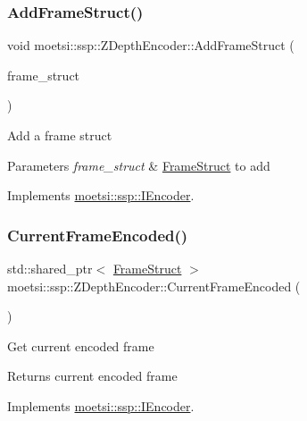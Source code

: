 \subsubsection{\texorpdfstring{Add\+Frame\+Struct()}{AddFrameStruct()}}
{\footnotesize\ttfamily void moetsi\+::ssp\+::\+Z\+Depth\+Encoder\+::\+Add\+Frame\+Struct (\begin{DoxyParamCaption}\item[{std\+::shared\+\_\+ptr$<$ \hyperlink{structmoetsi_1_1ssp_1_1FrameStruct}{Frame\+Struct} $>$ \&}]{frame\+\_\+struct }\end{DoxyParamCaption})\hspace{0.3cm}{\ttfamily [virtual]}}

Add a frame struct 
\begin{DoxyParams}{Parameters}
{\em frame\+\_\+struct} & \hyperlink{structmoetsi_1_1ssp_1_1FrameStruct}{Frame\+Struct} to add \\
\hline
\end{DoxyParams}


Implements \hyperlink{classmoetsi_1_1ssp_1_1IEncoder_a8c223ec82fdd30ee8ee75157306054ec}{moetsi\+::ssp\+::\+I\+Encoder}.

\mbox{\label{classmoetsi_1_1ssp_1_1ZDepthEncoder_a075752f62bbc40f71026812c5548ef5f}} 
\subsubsection{\texorpdfstring{Current\+Frame\+Encoded()}{CurrentFrameEncoded()}}
{\footnotesize\ttfamily std\+::shared\+\_\+ptr$<$ \hyperlink{structmoetsi_1_1ssp_1_1FrameStruct}{Frame\+Struct} $>$ moetsi\+::ssp\+::\+Z\+Depth\+Encoder\+::\+Current\+Frame\+Encoded (\begin{DoxyParamCaption}{ }\end{DoxyParamCaption})\hspace{0.3cm}{\ttfamily [virtual]}}

Get current encoded frame \begin{DoxyReturn}{Returns}
current encoded frame 
\end{DoxyReturn}


Implements \hyperlink{classmoetsi_1_1ssp_1_1IEncoder_a178d117518e7c7007414ea9c82bd3ed6}{moetsi\+::ssp\+::\+I\+Encoder}.

